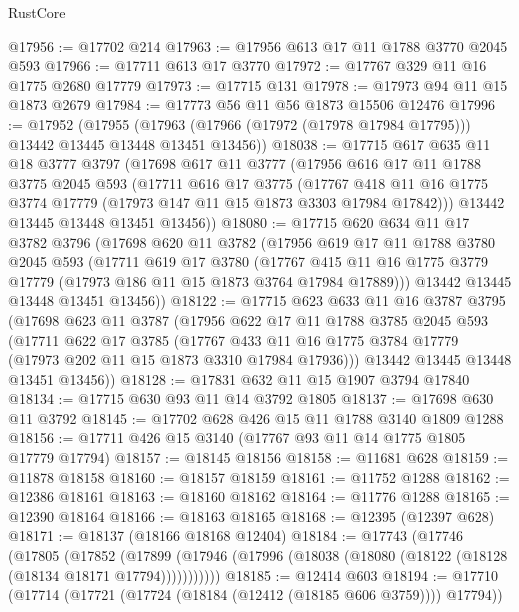 \begin{lexlean}{RustCore}
\begin{coremodule}
@17956 := @17702 @214
@17963 := @17956 @613 @17 @11 @1788 @3770 @2045 @593
@17966 := @17711 @613 @17 @3770
@17972 := @17767 @329 @11 @16 @1775 @2680 @17779
@17973 := @17715 @131
@17978 := @17973 @94 @11 @15 @1873 @2679
@17984 := @17773 @56 @11 @56 @1873 @15506 @12476
@17996 := @17952
    (@17955 (@17963 (@17966 (@17972 (@17978 @17984 @17795))) @13442 @13445 @13448 @13451 @13456))
@18038 := @17715
    @617
    @635
    @11
    @18
    @3777
    @3797
    (@17698
      @617
      @11
      @3777
      (@17956
        @616
        @17
        @11
        @1788
        @3775
        @2045
        @593
        (@17711
          @616
          @17
          @3775
          (@17767 @418 @11 @16 @1775 @3774 @17779 (@17973 @147 @11 @15 @1873 @3303 @17984 @17842)))
        @13442
        @13445
        @13448
        @13451
        @13456))
@18080 := @17715
    @620
    @634
    @11
    @17
    @3782
    @3796
    (@17698
      @620
      @11
      @3782
      (@17956
        @619
        @17
        @11
        @1788
        @3780
        @2045
        @593
        (@17711
          @619
          @17
          @3780
          (@17767 @415 @11 @16 @1775 @3779 @17779 (@17973 @186 @11 @15 @1873 @3764 @17984 @17889)))
        @13442
        @13445
        @13448
        @13451
        @13456))
@18122 := @17715
    @623
    @633
    @11
    @16
    @3787
    @3795
    (@17698
      @623
      @11
      @3787
      (@17956
        @622
        @17
        @11
        @1788
        @3785
        @2045
        @593
        (@17711
          @622
          @17
          @3785
          (@17767 @433 @11 @16 @1775 @3784 @17779 (@17973 @202 @11 @15 @1873 @3310 @17984 @17936)))
        @13442
        @13445
        @13448
        @13451
        @13456))
@18128 := @17831 @632 @11 @15 @1907 @3794 @17840
@18134 := @17715 @630 @93 @11 @14 @3792 @1805
@18137 := @17698 @630 @11 @3792
@18145 := @17702 @628 @426 @15 @11 @1788 @3140 @1809 @1288
@18156 := @17711 @426 @15 @3140 (@17767 @93 @11 @14 @1775 @1805 @17779 @17794)
@18157 := @18145 @18156
@18158 := @11681 @628
@18159 := @11878 @18158
@18160 := @18157 @18159
@18161 := @11752 @1288
@18162 := @12386 @18161
@18163 := @18160 @18162
@18164 := @11776 @1288
@18165 := @12390 @18164
@18166 := @18163 @18165
@18168 := @12395 (@12397 @628)
@18171 := @18137 (@18166 @18168 @12404)
@18184 := @17743
    (@17746
      (@17805
        (@17852
          (@17899 (@17946 (@17996 (@18038 (@18080 (@18122 (@18128 (@18134 @18171 @17794)))))))))))
@18185 := @12414 @603
@18194 := @17710 (@17714 (@17721 (@17724 (@18184 (@12412 (@18185 @606 @3759)))) @17794))

\end{coremodule}
\end{lexlean}
